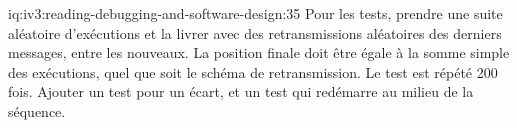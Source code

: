 \begin{solution}{iq:iv3:reading-debugging-and-software-design:35}
Pour les tests, prendre une suite aléatoire d'exécutions et la livrer avec des retransmissions aléatoires des derniers messages, entre les nouveaux. La position finale doit être égale à la somme simple des exécutions, quel que soit le schéma de retransmission. Le test est répété 200 fois. Ajouter un test pour un écart, et un test qui redémarre au milieu de la séquence.


\end{solution}

